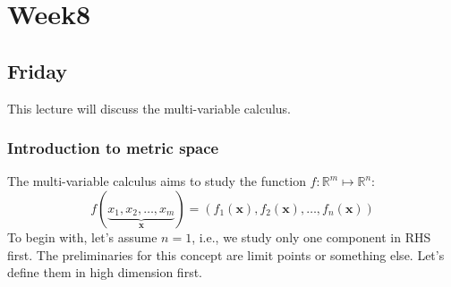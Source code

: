 \chapter{Week8}
\section{Friday}
This lecture will discuss the multi-variable calculus. 
\subsection{Introduction to metric space}
The multi-variable calculus aims to study the function $f:\mathbb{R}^m\mapsto\mathbb{R}^n$:
\[
f(\underbrace{x_1,x_2,\dots,x_m}_{\bm x})=(f_1(\bm x),f_2(\bm x),\dots,f_n(\bm x))
\]
To begin with, let's assume $n=1$, i.e., we study only one component in RHS first. The preliminaries for this concept are limit points or something else. Let's define them in high dimension first.
